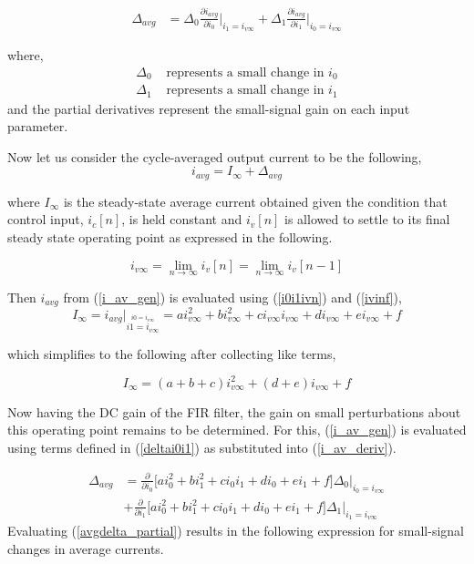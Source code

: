 \documentclass[conference]{IEEEtran}
\begin{document}
\begin{align}
\Delta{_{avg}} &= \Delta{_0}\frac{\partial i_{avg}}{\partial i_0}\bigg|_{i_1=i_{v\infty}} + \Delta{_1}\frac{\partial i_{avg}}{\partial i_1}\bigg|_{i_0=i_{v\infty}} 
  \label{i_av_deriv}
\end{align}

where,
\begin{align}
	\Delta_0 & \text{ represents a small change in } i_0 \nonumber \\
	\Delta_1 & \text{ represents a small change in } i_1 
	\label{deltai0i1}
\end{align}
and the partial derivatives represent the small-signal gain on each input parameter.

Now let us consider the cycle-averaged output current to be the following,
\begin{equation}	
	i_{avg} = I_{\infty} + \Delta_{avg}
\end{equation}

where $I_{\infty}$ is the steady-state average current obtained given the condition that control input, $i_c[n]$, is held constant and $i_v[n]$ is allowed to settle to its final steady state operating point as expressed in the following.

\begin{equation}
	i_{v\infty} = \lim_{n \to \infty} i_{v}[n] = \lim_{n \to \infty}  i_{v}[n-1]
	\label{ivinf}
\end{equation}

Then $i_{avg}$ from (\ref{i_av_gen}) is evaluated using (\ref{i0i1ivn}) and (\ref{ivinf}),
\begin{equation}
	I_{\infty} = i_{avg} \bigg|_{\stackrel{i0=i_{v \infty}}{i1=i_{v \infty}}} = a i_{v \infty}^2+b i_{v \infty}^2+c i_{v \infty}i_{v \infty}+d i_{v \infty}+e i_{v \infty}+f 
\end{equation}

which simplifies to the following after collecting like terms,

\begin{equation}
I_{\infty} = (a + b +c)i_{v \infty}^2 + (d+e)i_{v \infty} + f
\label{iavg_steady_state}
\end{equation}

Now having the DC gain of the FIR filter, the gain on small perturbations about this operating point remains to be determined.  For this,  (\ref{i_av_gen}) is evaluated using terms defined in (\ref{deltai0i1}) as substituted into (\ref{i_av_deriv}).

\begin{align}
	\Delta_{avg} &= 
	\frac{\partial}{\partial i_0} 
	\bigg [
	a i_0^2+b i_1^2+c i_0i_1+d i_0+e i_1+f \bigg ] 
	\Delta_0 \bigg |_{i_0=i_{v\infty}} \nonumber \\
	&+ 
	\frac{\partial}{\partial i_1} 
	\bigg [
	a i_0^2+b i_1^2+c i_0i_1+d i_0+e i_1+f \bigg ] 
	\Delta_1 \bigg |_{i_1=i_{v\infty}}
	\label{avgdelta_partial}
\end{align}
Evaluating (\ref{avgdelta_partial}) results in the following expression for small-signal changes in average currents.
\end{document}

